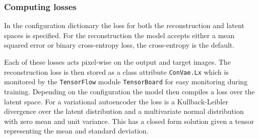\subsubsection{Computing losses}

In the configuration dictionary the loss for both the reconstruction and latent spaces is specified. For the reconstruction the model accepts either a mean squared error or binary cross-entropy loss, the cross-entropy is the default. 

Each of these losses acts pixel-wise on the output and target images. The reconstruction loss is then stored as a class attribute \lstinline{ConVae.Lx} which is monitored by the \lstinline{TensorFlow} module \lstinline{TensorBoard} for easy monitoring during training. Depending on the configuration the model then compiles a loss over the latent space. For a variational autoencoder the loss is a Kullback-Leibler divergence over the latent distribution and a multivariate normal distribution with zero mean and unit variance. This has a closed form solution given a tensor representing the mean and standard deviation.



